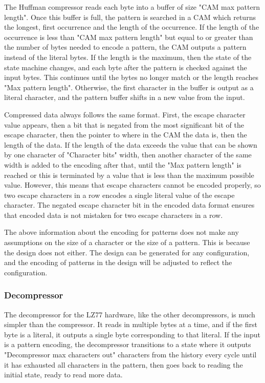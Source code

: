 \documentclass[doublespace,nopageskip]{VTthesis}
\begin{document}
The Huffman compressor reads each byte into a buffer of size "CAM max pattern length". Once this buffer is full, the pattern is searched in a CAM which returns the longest, first occurrence and the length of the occurrence. If the length of the occurrence is less than "CAM max pattern length" but equal to or greater than the number of bytes needed to encode a pattern, the CAM outputs a pattern instead of the literal bytes. If the length is the maximum, then the state of the state machine changes, and each byte after the pattern is checked against the input bytes. This continues until the bytes no longer match or the length reaches "Max pattern length". Otherwise, the first character in the buffer is output as a literal character, and the pattern buffer shifts in a new value from the input.

Compressed data always follows the same format. First, the escape character value appears, then a bit that is negated from the most significant bit of the escape character, then the pointer to where in the CAM the data is, then the length of the data. If the length of the data exceeds the value that can be shown by one character of "Character bits" width, then another character of the same width is added to the encoding after that, until the "Max pattern length" is reached or this is terminated by a value that is less than the maximum possible value. However, this means that escape characters cannot be encoded properly, so two escape characters in a row encodes a single literal value of the escape character. The negated escape character bit in the encoded data format ensures that encoded data is not mistaken for two escape characters in a row.

The above information about the encoding for patterns does not make any assumptions on the size of a character or the size of a pattern. This is because the design does not either. The design can be generated for any configuration, and the encoding of patterns in the design will be adjusted to reflect the configuration.

\subsubsection{Decompressor}\label{sss:decompressor}
The decompressor for the LZ77 hardware, like the other decompressors, is much simpler than the compressor. It reads in multiple bytes at a time, and if the first byte is a literal, it outputs a single byte corresponding to that literal. If the input is a pattern encoding, the decompressor transitions to a state where it outputs "Decompressor max characters out" characters from the history every cycle until it has exhausted all characters in the pattern, then goes back to reading the initial state, ready to read more data.
\end{document}
